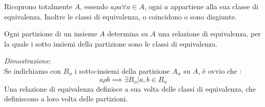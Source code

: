 \documentclass[12pt, letterpaper]{article}
\begin{document}
    Ricoprono totalmente \(A\), essendo \(a \rho a \forall a \in A\), ogni \(a\) appartiene alla sua classe 
    di equivalenza.  Inoltre le classi di equivalenza, o coincidono o sono disgiunte.
\begin{prop}
    Ogni partizione di un insieme \(A\) determina su \(A\) una relazione di equivalenza, per la quale i sotto insiemi
    della partizione sono le classi di equivalenza.
\end{prop}
\textit{Dimostrazione}:\\
Se indichiamo con \(B_\alpha\) i sotto-insiemi della partizione \(A_\alpha\) su \(A\), è ovvio che :
\begin{equation}
    a\rho b \implies \exists B_\alpha | a,b \in B_\alpha
\end{equation}
Una relazione di equivalenza definisce a sua volta delle classi di equivalenza, che definiscono a loro volta delle partizioni.
\end{document}
